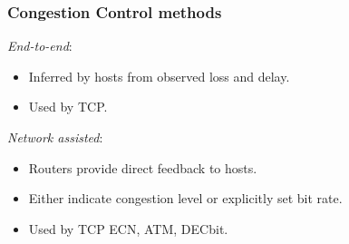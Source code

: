 \subsubsection{Congestion Control methods}

\textit{End-to-end}:

\begin{itemize}
    \item Inferred by hosts from observed loss and delay.
    \item Used by TCP.
\end{itemize}

\textit{Network assisted}:

\begin{itemize}
    \item Routers provide direct feedback to hosts.
    \item Either indicate congestion level or explicitly set bit rate.
    \item Used by TCP ECN, ATM, DECbit.
\end{itemize}
